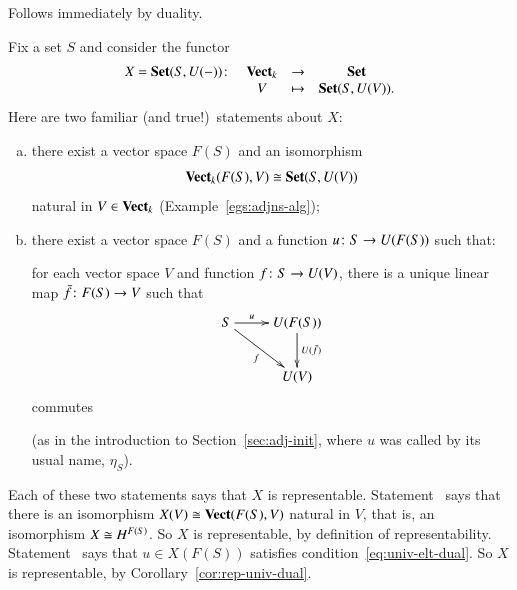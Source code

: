 \begin{pf}
Follows immediately by duality.
\end{pf}

\begin{example}
Fix a set $S$ and consider the functor
\[
\begin{array}{cccc}
X = \Set(S, U(\dashbk))\from            &
\Vect_k &\to            &\Set           \\
                                        &
V       &\mapsto        &\Set(S, U(V)).
\end{array}
\]
Here are two familiar (and true!)\ statements about $X$:
%
\begin{enumerate}[(b)]
\item
\label{item:vs-rep-direct}
there exist a vector space $F(S)$ and an isomorphism%
%
%
%
\begin{equation}
\label{eq:vect-adj}
\mathbf{Vect}_k(F(S), V) \cong \mathbf{Set}(S, U(V))
\end{equation}
%
natural in $V \in \mathbf{Vect}_k$
(Example~\ref{egs:adjns-alg});

\item
\label{item:vs-rep-univ}
there exist a vector space $F(S)$ and a function $u\from S \to U(F(S))$%
%
%
such that:
%
\begin{displaytext}
for each vector space $V$ and function $f\from S \to U(V)$, there is a unique
linear map $\bar{f}\from F(S) \to V$ such that
\[
\xymatrix{
S \ar[r]^-u \ar[dr]_f    &U(F(S)) \ar[d]^{U(\bar{f})}    \\
        &
U(V)
}
\]
commutes
\end{displaytext}
%
(as in the introduction to Section~\ref{sec:adj-init}, where $u$ was called by
its usual name, $\eta_S$).
\end{enumerate}

Each of these two statements says that $X$ is representable.
Statement~ says that there is an isomorphism
$X(V) \cong \mathbf{Vect}(F(S), V)$ natural in $V$, that is, an isomorphism $X \cong
H^{F(S)}$.  So $X$ is representable, by definition of representability.
Statement~ says that $u \in X(F(S))$ satisfies
condition~\eqref{eq:univ-elt-dual}.  So $X$ is representable, by
Corollary~\ref{cor:rep-univ-dual}.


\end{example}

